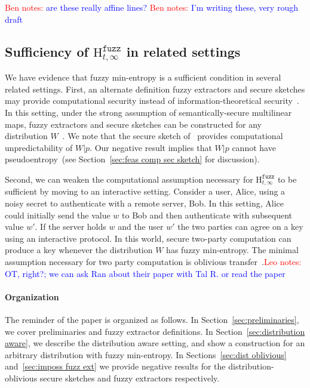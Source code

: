 \documentclass[11pt]{article}
\newcommand{\secref}[1]{\mbox{Section~\ref{#1}}}
\newcommand{\Hfuzz}{\mathrm{H}^{\mathtt{fuzz}}_{t,\infty}}
\newcommand{\authnote}[2]{{\textcolor{red}{\textsf{#1 notes: }\textcolor{blue}{ #2}}\marginpar{\textcolor{red}{\textbf{!!!!!}}}}}
\newcommand{\authnote}[2]{}
\newcommand{\bnote}[1]{{\authnote{Ben}{#1}}}
\newcommand{\lnote}[1]{{\authnote{Leo}{#1}}}
\begin{document}
\bnote{are these really affine lines?}
\bnote{I'm writing these, very rough draft}

\subsection{Sufficiency of $\Hfuzz$ in related settings}
\label{sec:related settings}
We have evidence that fuzzy min-entropy is a sufficient condition in several related settings.  
First, an alternate definition fuzzy extractors and secure sketches may provide computational security instead of information-theoretical security~\cite{fuller2013computational}.  In this setting, under the strong assumption of semantically-secure multilinear maps, fuzzy extractors and secure sketches can be constructed for any distribution $W$~\cite{BitanskyCKP14}.  We note that the secure sketch of~\cite{BitanskyCKP14} provides computational unpredictability of $W |p$.  Our negative result implies that $W|p$ cannot have pseudoentropy~(see \secref{sec:feas comp sec sketch} for discussion).

Second, we can weaken the computational assumption necessary for $\Hfuzz$ to be sufficient by moving to an interactive setting.
Consider a user, Alice, using a noisy secret to authenticate with a remote server, Bob.  In this setting, Alice could initially send the value $w$ to Bob and then authenticate with subsequent value $w'$.  If the server holds $w$ and the user $w'$ the two parties can agree on a key using an interactive protocol.
In this world, secure two-party computation can produce a key whenever the distribution $W$ has fuzzy min-entropy.  The minimal assumption necessary for two party computation is oblivious transfer~\cite{lindell2009proof}.\lnote{OT, right?; we can ask Ran about their paper with Tal R. or read the paper}


\paragraph{Organization} The reminder of the paper is organized as follows.  In \secref{sec:preliminaries}, we cover preliminaries and fuzzy extractor definitions.  In \secref{sec:distribution aware}, we describe the distribution aware setting, and show a construction for an arbitrary distribution with fuzzy min-entropy.  In Sections~\ref{sec:dist oblivious} and~\ref{sec:imposs fuzz ext} we provide negative results for the distribution-oblivious secure sketches and fuzzy extractors respectively.
\end{document}
